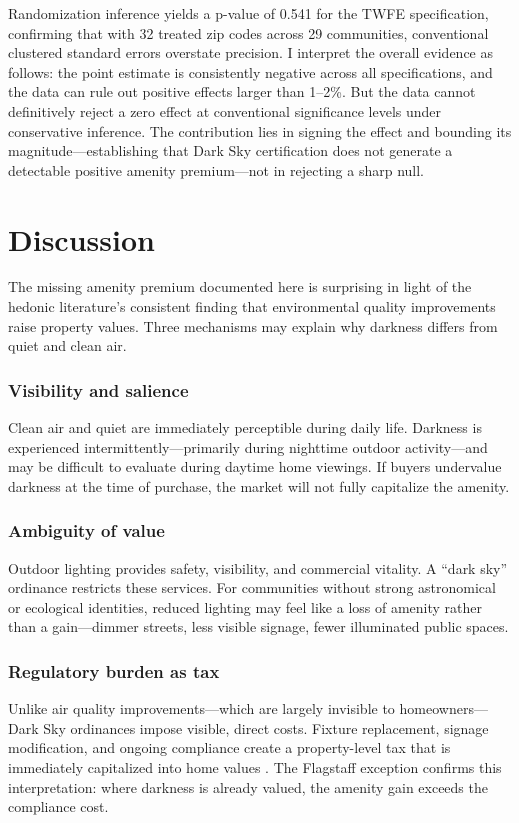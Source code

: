 \documentclass[12pt]{article}
\begin{document}
Randomization inference yields a p-value of 0.541 for the TWFE specification, confirming that with 32 treated zip codes across 29 communities, conventional clustered standard errors overstate precision. I interpret the overall evidence as follows: the point estimate is consistently negative across all specifications, and the data can rule out positive effects larger than 1--2\%. But the data cannot definitively reject a zero effect at conventional significance levels under conservative inference. The contribution lies in signing the effect and bounding its magnitude---establishing that Dark Sky certification does not generate a detectable positive amenity premium---not in rejecting a sharp null.

\section{Discussion}

The missing amenity premium documented here is surprising in light of the hedonic literature's consistent finding that environmental quality improvements raise property values. Three mechanisms may explain why darkness differs from quiet and clean air.

\subsubsection*{Visibility and salience} Clean air and quiet are immediately perceptible during daily life. Darkness is experienced intermittently---primarily during nighttime outdoor activity---and may be difficult to evaluate during daytime home viewings. If buyers undervalue darkness at the time of purchase, the market will not fully capitalize the amenity.

\subsubsection*{Ambiguity of value} Outdoor lighting provides safety, visibility, and commercial vitality. A ``dark sky'' ordinance restricts these services. For communities without strong astronomical or ecological identities, reduced lighting may feel like a loss of amenity rather than a gain---dimmer streets, less visible signage, fewer illuminated public spaces.

\subsubsection*{Regulatory burden as tax} Unlike air quality improvements---which are largely invisible to homeowners---Dark Sky ordinances impose visible, direct costs. Fixture replacement, signage modification, and ongoing compliance create a property-level tax that is immediately capitalized into home values \citep{oates1969effects}. The Flagstaff exception confirms this interpretation: where darkness is already valued, the amenity gain exceeds the compliance cost.
\end{document}
